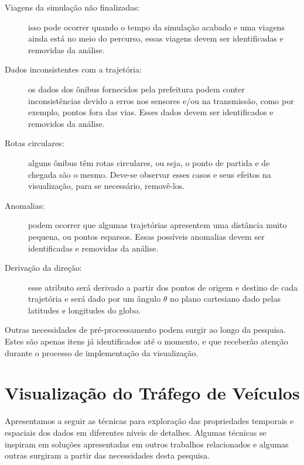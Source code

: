 \begin{description}
  \item[Viagens da simulação não finalizadas:] isso pode ocorrer
quando o tempo da simulação acabado e uma viagens ainda está no meio do percurso,
essas viagens devem ser identificadas e removidas da análise.

  \item[Dados inconsistentes com a trajetória:] os dados dos ônibus fornecidos
pela prefeitura podem conter inconsistências devido a erros nos sensores e/ou na transmissão,
como por exemplo, pontos fora das vias. Esses dados devem ser identificados e removidos da análise.

  \item[Rotas circulares:] alguns ônibus têm rotas circulares, ou seja, o ponto
de partida e de chegada são o mesmo. Deve-se observar esses casos e seus efeitos
na visualização, para se necessário, removê-los.

  \item[Anomalias:] podem ocorrer que algumas trajetórias apresentem uma distância
muito pequena, ou pontos esparsos. Essas possíveis anomalias devem ser identificadas
e removidas da análise.

  \item[Derivação da direção:] esse atributo será derivado a partir dos pontos
de origem e destino de cada trajetória e será dado por um ângulo $\theta$ no
plano cartesiano dado pelas latitudes e longitudes do globo.
\end{description}

  Outras necessidades de pré-processamento podem surgir ao longo da pesquisa.
Estes são apenas itens já identificados até o momento, e que receberão atenção
durante o processo de implementação da visualização.

\section{Visualização do Tráfego de Veículos}

  Apresentamos a seguir as técnicas para exploração das propriedades temporais
e espaciais dos dados em diferentes níveis de detalhes. Algumas técnicas se
inspiram em soluções apresentadas em outros trabalhos relacionados e algumas
outras surgiram a partir das necessidades desta pesquisa.

